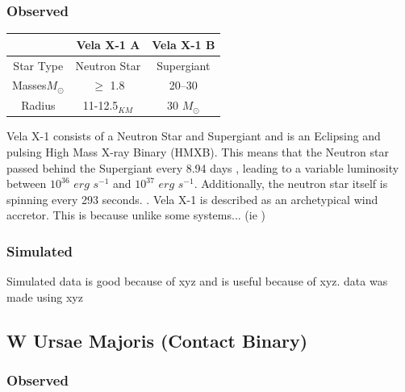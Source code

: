 \documentclass[12pt, letterpaper]{article}
\begin{document}
        \subsubsection{Observed}
        \begin{center}
            \begin{tabular}{||c c c||} 
             \hline
             & Vela X-1 A & Vela X-1 B  \\ 
             \hline\hline
             Star Type & Neutron Star & Supergiant \cite{Kretschmar_2021} \\ 
             \hline
             Masses\(M_\odot\) & $\ge$ 1.8 \cite{Kretschmar_2021} & 20–30 \cite{Kretschmar_2021} \\
             \hline
             Radius & 11-12.5$_{KM}$ \cite{Kretschmar_2021} & 30 \(M_\odot\)
             \cite{Kretschmar_2021} \\ %
             \hline 
            \end{tabular}
        \end{center}
        Vela X-1 consists of a Neutron Star and Supergiant and is an Eclipsing and pulsing High Mass X-ray Binary (HMXB). This means that the Neutron star passed behind the Supergiant every 8.94 days \cite{Falanga_2015}, leading to a variable luminosity between $10^{36}$ $erg$ $s^{-1}$ and $10^{37}$ $erg$ $s^{-1}$. Additionally, the neutron star itself is spinning every 293 seconds. \cite{Kretschmar_2021}. 
        Vela X-1 is described as an archetypical wind accretor. This is because unlike some systems... (ie \cite{Kretschmar_2021}) 
            
            
        \subsubsection{Simulated}
        Simulated data is good because of xyz and is useful because of xyz. data was made using xyz

    \subsection{\centering W Ursae Majoris (Contact Binary)}
        \subsubsection{Observed}
        
\end{document}
